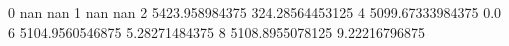 0 nan nan
1 nan nan
2 5423.958984375 324.28564453125
4 5099.67333984375 0.0
6 5104.9560546875 5.28271484375
8 5108.8955078125 9.22216796875
